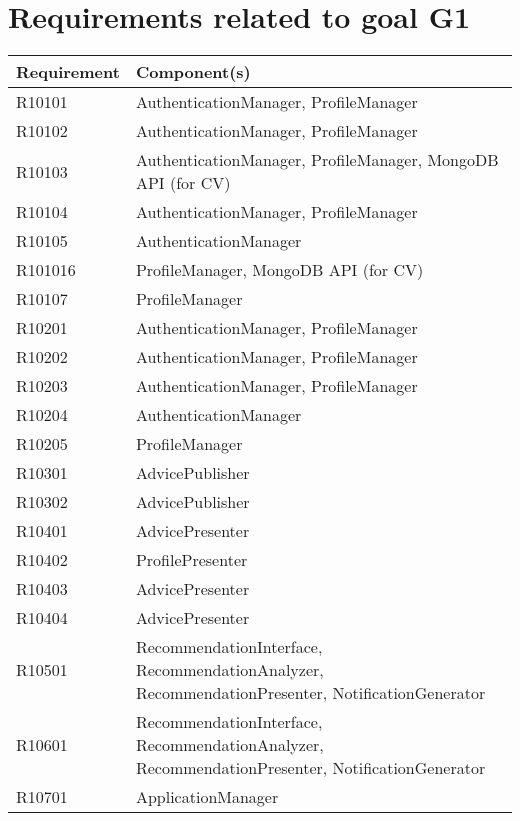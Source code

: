 	\section{Requirements related to goal G1}
			\begin{table}[H]
				\begin{tabular}{ | m{2.6cm} | m{9cm} | } 
					\hline
					\textbf {Requirement} & \textbf{Component(s)} \\
					\hline
						R10101 & AuthenticationManager, ProfileManager\\
					\hline
						R10102 & AuthenticationManager, ProfileManager \\
					\hline
						R10103 & AuthenticationManager, ProfileManager, MongoDB API (for CV)\\
					\hline
						R10104 & AuthenticationManager, ProfileManager\\
					\hline
						R10105 & AuthenticationManager \\
					\hline
						R101016 & ProfileManager, MongoDB API (for CV) \\
					\hline
						R10107 & ProfileManager \\
					\hline
						R10201 & AuthenticationManager, ProfileManager \\
					\hline
						R10202 & AuthenticationManager, ProfileManager \\
					\hline
						R10203 & AuthenticationManager, ProfileManager \\
					\hline
						R10204 & AuthenticationManager \\
					\hline
						R10205 & ProfileManager \\
					\hline
						R10301 & AdvicePublisher \\
					\hline
						R10302 & AdvicePublisher \\
					\hline
						R10401 & AdvicePresenter \\
					\hline
						R10402 & ProfilePresenter \\
					\hline
						R10403 & AdvicePresenter \\
					\hline
						R10404 & AdvicePresenter \\
					\hline
						R10501 & RecommendationInterface, RecommendationAnalyzer, RecommendationPresenter, NotificationGenerator\\
					\hline
						R10601 & RecommendationInterface, RecommendationAnalyzer, RecommendationPresenter, NotificationGenerator\\
					\hline
						R10701 & ApplicationManager \\

\end{tabular}
\end{table}
